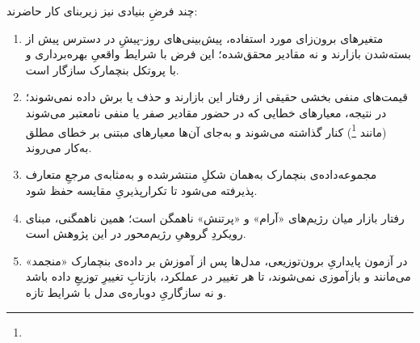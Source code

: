 چند فرضِ بنیادی نیز زیربنای کار حاضرند:

\begin{enumerate}
\item متغیرهای برون‌زای مورد استفاده، پیش‌بینی‌های روز-پیشِ در دسترس پیش از
بسته‌شدن بازارند و نه مقادیر محقق‌شده؛ این فرض با شرایط واقعیِ بهره‌برداری و با
پروتکل بنچمارک سازگار است.

\item قیمت‌های منفی بخشی حقیقی از رفتار این بازارند و حذف یا برش داده نمی‌شوند؛ در
نتیجه، معیارهای خطایی که در حضور مقادیر صفر یا منفی نامعتبر می‌شوند (مانند
\footnote{}) کنار گذاشته می‌شوند و به‌جای آن‌ها معیارهای مبتنی بر خطای مطلق به‌کار
می‌روند.

\item مجموعه‌داده‌ی بنچمارک به‌همان شکلِ منتشرشده و به‌مثابه‌ی مرجعِ متعارف
پذیرفته می‌شود تا تکرارپذیریِ مقایسه حفظ شود.

\item رفتار بازار میان رژیم‌های «آرام» و «پرتنش» ناهمگن است؛ همین ناهمگنی، مبنای
رویکردِ گروهیِ رژیم‌محور در این پژوهش است.

\item در آزمون پایداریِ برون‌توزیعی، مدل‌ها پس از آموزش بر داده‌ی بنچمارک
«منجمد» می‌مانند و بازآموزی نمی‌شوند، تا هر تغییر در عملکرد، بازتابِ تغییرِ توزیعِ
داده باشد و نه سازگاریِ دوباره‌ی مدل با شرایط تازه.
\end{enumerate}
